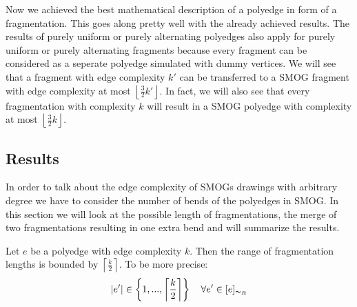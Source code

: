 Now we achieved the best mathematical description of a polyedge in form of a fragmentation. This goes along pretty well with the already achieved results. The results of purely uniform or purely alternating polyedges also apply for purely uniform or purely alternating fragments because every fragment can be considered as a seperate polyedge simulated with dummy vertices. We will see that a fragment with edge complexity $k'$ can be transferred to a SMOG fragment with edge complexity at most $\left\lfloor\frac{3}{2}k'\right\rfloor$. In fact, we will also see that every fragmentation with complexity $k$ will result in a SMOG polyedge with complexity at most $\left\lfloor\frac{3}{2}k\right\rfloor$.
\subsection{Results}
In order to talk about the edge complexity of SMOGs drawings with arbitrary degree we have to consider the number of bends of the polyedges in SMOG. In this section we will look at the possible length of fragmentations, the merge of two fragmentations resulting in one extra bend and will summarize the results.
\begin{lemma}
	Let $e$ be a polyedge with edge complexity $k$. Then the range of fragmentation lengths is bounded by $\left\lceil\frac{k}{2}\right\rceil$. To be more precise: $$ |e'| \in \left\{1,..., \left\lceil\frac{k}{2}\right\rceil\right\}~~~\forall e'\in [e]_{\thicksim_R} $$
\end{lemma}
